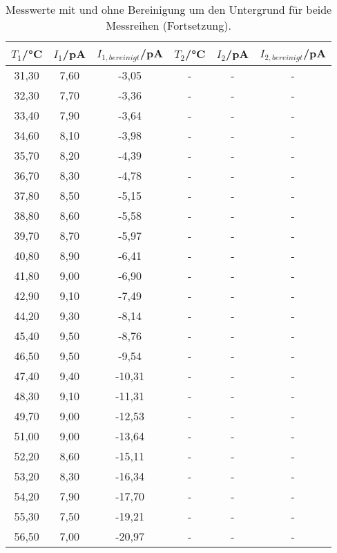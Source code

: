 \begin{table}[htp]
	\begin{center}
    \caption{Messwerte mit und ohne Bereinigung um den Untergrund für beide Messreihen (Fortsetzung).}
    \label{tab:messwerte3}
		\begin{tabular}{cccccc}
		\toprule
			{$T_1$/°C} & {$I_1$/pA} & {$I_{1,bereinigt}$/pA} & {$T_2$/°C} & {$I_2$/pA} & {$I_{2,bereinigt}$/pA}\\
			\midrule
			31,30 & 7,60 & -3,05  & - & - & -\\
			32,30 & 7,70 & -3,36  & - & - & -\\
			33,40 & 7,90 & -3,64  & - & - & -\\
			34,60 & 8,10 & -3,98  & - & - & -\\
			35,70 & 8,20 & -4,39  & - & - & -\\
			36,70 & 8,30 & -4,78  & - & - & -\\
			37,80 & 8,50 & -5,15  & - & - & -\\
			38,80 & 8,60 & -5,58  & - & - & -\\
			39,70 & 8,70 & -5,97  & - & - & -\\
			40,80 & 8,90 & -6,41  & - & - & -\\
			41,80 & 9,00 & -6,90  & - & - & -\\
			42,90 & 9,10 & -7,49  & - & - & -\\
			44,20 & 9,30 & -8,14  & - & - & -\\
			45,40 & 9,50 & -8,76  & - & - & -\\
			46,50 & 9,50 & -9,54  & - & - & -\\
			47,40 & 9,40 & -10,31 & - & - & -\\
			48,30 & 9,10 & -11,31 & - & - & -\\
			49,70 & 9,00 & -12,53 & - & - & -\\
			51,00 & 9,00 & -13,64 & - & - & -\\
			52,20 & 8,60 & -15,11 & - & - & -\\
			53,20 & 8,30 & -16,34 & - & - & -\\
			54,20 & 7,90 & -17,70 & - & - & -\\
			55,30 & 7,50 & -19,21 & - & - & -\\
			56,50 & 7,00 & -20,97 & - & - & -\\
		\bottomrule
		\end{tabular}
	\end{center}
\end{table}

\newpage
